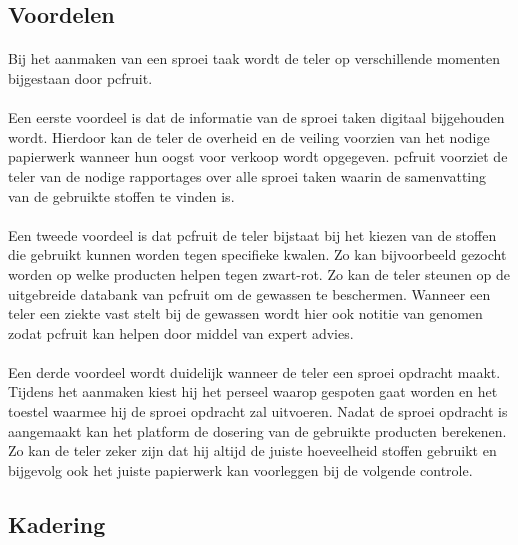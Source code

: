 \subsection {Voordelen}

\paragraph {} Bij het aanmaken van een sproei taak wordt de teler op verschillende
momenten bijgestaan door pcfruit.

\paragraph {} Een eerste voordeel is dat de informatie van de sproei taken digitaal
bijgehouden wordt.  Hierdoor kan de teler de overheid en de veiling voorzien van het
nodige papierwerk wanneer hun oogst voor verkoop wordt opgegeven. pcfruit voorziet de
teler van de nodige rapportages over alle sproei taken waarin de samenvatting van de
gebruikte stoffen te vinden is.

\paragraph {} Een tweede voordeel is dat pcfruit de teler bijstaat bij het kiezen van de
stoffen die gebruikt kunnen worden tegen specifieke kwalen. Zo kan bijvoorbeeld gezocht
worden op welke producten helpen tegen zwart-rot. Zo kan de teler steunen op de
uitgebreide databank van pcfruit om de gewassen te beschermen. Wanneer een teler een
ziekte vast stelt bij de gewassen wordt hier ook notitie van genomen zodat pcfruit kan
helpen door middel van expert advies.

\paragraph {} Een derde voordeel wordt duidelijk wanneer de teler een sproei opdracht
maakt. Tijdens het aanmaken kiest hij het perseel waarop gespoten gaat worden en het
toestel waarmee hij de sproei opdracht zal uitvoeren. Nadat de sproei opdracht is
aangemaakt kan het platform de dosering van de gebruikte producten berekenen. Zo kan de
teler zeker zijn dat hij altijd de juiste hoeveelheid stoffen gebruikt en bijgevolg ook
het juiste papierwerk kan voorleggen bij de volgende controle.


\subsection {Kadering}

